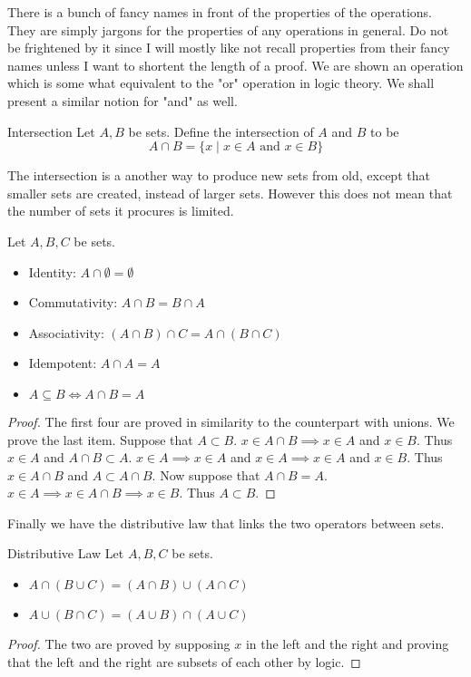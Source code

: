\documentclass[a4paper]{article}
\begin{document}
There is a bunch of fancy names in front of the properties of the operations. They are simply jargons for the properties of any operations in general. Do not be frightened by it since I will mostly like not recall properties from their fancy names unless I want to shortent the length of a proof. \linebreak\linebreak
We are shown an operation which is some what equivalent to the "or" operation in logic theory. We shall present a similar notion for "and" as well. 

\begin{defn}{Intersection}{} Let $A,B$ be sets. Define the intersection of $A$ and $B$ to be $$A\cap B=\{x\;|\;x\in A\text{ and }x\in B\}$$
\end{defn}

The intersection is a another way to produce new sets from old, except that smaller sets are created, instead of larger sets. However this does not mean that the number of sets it procures is limited. 

\begin{prp}{}{} Let $A,B,C$ be sets. 
\begin{itemize}
\item Identity: $A\cap\emptyset=\emptyset$
\item Commutativity: $A\cap B=B\cap A$
\item Associativity: $(A\cap B)\cap C=A\cap(B\cap C)$
\item Idempotent: $A\cap A=A$
\item $A\subseteq B\iff A\cap B=A$
\end{itemize}
\begin{proof} The first four are proved in similarity to the counterpart with unions. We prove the last item. Suppose that $A\subset B$. $x\in A\cap B\implies x\in A$ and $x\in B$. Thus $x\in A$ and $A\cap B\subset A$. $x\in A\implies x\in A$ and $x\in A\implies x\in A$ and $x\in B$. Thus $x\in A\cap B$ and $A\subset A\cap B$. Now suppose that $A\cap B=A$. $x\in A\implies x\in A\cap B\implies x\in B$. Thus $A\subset B$. 
\end{proof}
\end{prp}

Finally we have the distributive law that links the two operators between sets. 

\begin{thm}{Distributive Law}{} Let $A,B,C$ be sets. 
\begin{itemize}
\item $A\cap(B\cup C)=(A\cap B)\cup(A\cap C)$
\item $A\cup(B\cap C)=(A\cup B)\cap(A\cup C)$
\end{itemize}
\begin{proof} The two are proved by supposing $x$ in the left and the right and proving that the left and the right are subsets of each other by logic. 
\end{proof}
\end{thm}
\end{document}
